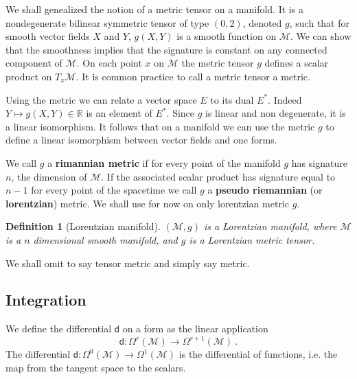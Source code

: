 \documentclass[11pt]{book}
\newcommand{\Mcal}{\mathcal{M}}
\newcommand{\Rbb}{\mathbb{R}}
\newcommand{\dsf}{\mathsf{d}}
\theoremstyle{break}
\newtheorem{definition}{Definition}[chapter]
\begin{document}
We shall genealized the notion of a metric tensor on a manifold. It is a nondegenerate bilinear symmetric tensor of type $(0,2)$, denoted $g$, such that for smooth vector fields $X$ and $Y$, $g(X,Y)$ is a smooth function on $\Mcal$. We can show that the smoothness implies that the signature is constant on any connected component of $\Mcal$. On each point $x$ on $\Mcal$ the metric tensor $g$ defines a scalar product on $T_x\Mcal$. It is common practice to call a metric tensor a metric.


Using the metric we can relate a vector space $E$ to its dual $E^\ast$. Indeed $Y \mapsto g(X,Y) \in \Rbb$ is an element of $E^\ast$. Since $g$ is linear and non degenerate, it is a linear isomorphism. It follows that on a manifold we can use the metric $g$ to define a linear isomorphism between vector fields and one forms. 


We call $g$ a \textbf{rimannian metric} if for every point of the manifold $g$ has signature $n$, the dimension of $\Mcal$. If the associated scalar product has signature equal to $n-1$ for every point of the spacetime we call $g$ a \textbf{pseudo riemannian} (or \textbf{lorentzian}) metric. We shall use for now on only lorentzian metric $g$.

\begin{definition}[Lorentzian manifold]\label{def:lorentzian_M}
$(\Mcal,g)$ is a Lorentzian manifold, where $\Mcal$ is a $n$ dimensional smooth manifold, and $g$ is a Lorentzian metric tensor.
\end{definition}


We shall omit to say tensor metric and simply say metric.


\subsection{Integration}


We define the differential $\dsf$ on a form as the linear application
%
\begin{equation*}
\dsf : \Omega^r(\Mcal) \to \Omega^{r+1}(\Mcal) \ .
\end{equation*}
%
The differential $\dsf : \Omega^0(\Mcal) \to \Omega^1(\Mcal)$ is the differential of functions, i.e. the map from the tangent space to the scalars.
\end{document}
